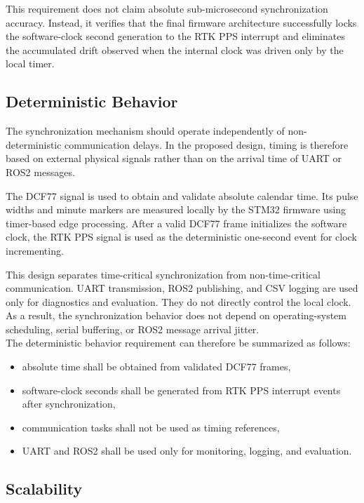 This requirement does not claim absolute sub-microsecond synchronization accuracy. Instead, it verifies that the final firmware architecture successfully locks the software-clock second generation to the RTK PPS interrupt and eliminates the accumulated drift observed when the internal clock was driven only by the local timer.

\subsection{Deterministic Behavior}

The synchronization mechanism should operate independently of non-deterministic communication delays. In the proposed design, timing is therefore based on external physical signals rather than on the arrival time of UART or ROS2 messages.

The DCF77 signal is used to obtain and validate absolute calendar time. Its pulse widths and minute markers are measured locally by the STM32 firmware using timer-based edge processing. After a valid DCF77 frame initializes the software clock, the RTK PPS signal is used as the deterministic one-second event for clock incrementing.

This design separates time-critical synchronization from non-time-critical communication. UART transmission, ROS2 publishing, and CSV logging are used only for diagnostics and evaluation. They do not directly control the local clock. As a result, the synchronization behavior does not depend on operating-system scheduling, serial buffering, or ROS2 message arrival jitter.
\\
The deterministic behavior requirement can therefore be summarized as follows:
\begin{itemize}
    \item absolute time shall be obtained from validated DCF77 frames,
    \item software-clock seconds shall be generated from RTK PPS interrupt events after synchronization,
    \item communication tasks shall not be used as timing references,
    \item UART and ROS2 shall be used only for monitoring, logging, and evaluation.
\end{itemize}

\subsection{Scalability}

